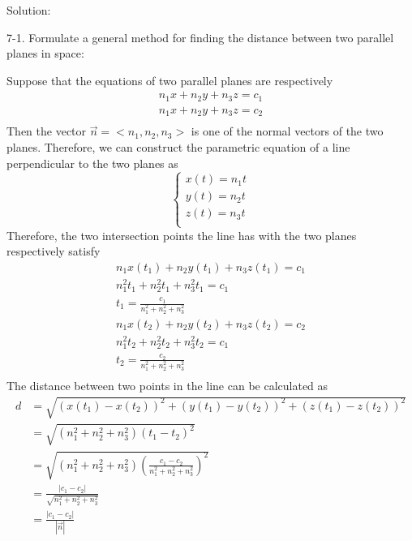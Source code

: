 \documentclass{article}
\begin{document}
Solution:

7-1. Formulate a general method for finding the distance between two parallel 
planes in space:

Suppose that the equations of two parallel planes are respectively
\begin{gather*}
  n_1x + n_2y + n_3z = c_1 \\
  n_1x + n_2y + n_3z = c_2 \\
\end{gather*}
Then the vector $\vec{n} = <n_1, n_2, n_3>$ is one of the normal vectors of the 
two planes. Therefore, we can construct the parametric equation of a line 
perpendicular to the two planes as
\begin{equation*}
  \begin{cases}
    x(t) = n_1t \\
    y(t) = n_2t \\
    z(t) = n_3t \\
  \end{cases}
\end{equation*}
Therefore, the two intersection points the line has with the two planes 
respectively satisfy
\begin{gather*}
  n_1x(t_1) + n_2y(t_1) + n_3z(t_1) = c_1 \\
  n_1^2t_1 + n_2^2t_1 + n_3^2t_1 = c_1 \\
  t_1 = \frac{c_1}{n_1^2 + n_2^2 + n_3^2} \\
  n_1x(t_2) + n_2y(t_2) + n_3z(t_2) = c_2 \\
  n_1^2t_2 + n_2^2t_2 + n_3^2t_2 = c_1 \\
  t_2 = \frac{c_2}{n_1^2 + n_2^2 + n_3^2} \\
\end{gather*}
The distance between two points in the line can be calculated as 
\begin{equation*}
  \begin{split}
    d &= \sqrt{(x(t_1) - x(t_2))^2 + (y(t_1) - y(t_2))^2 + (z(t_1) - z(t_2))^2} \\
      &= \sqrt{(n_1^2 + n_2^2 + n_3^2)(t_1 - t_2)^2} \\
      &= \sqrt{(n_1^2 + n_2^2 + n_3^2)(\frac{c_1 - c_2}{n_1^2 + n_2^2 + n_3^2})^2} \\
      &= \frac{|c_1 - c_2|}{\sqrt{n_1^2 + n_2^2 + n_3^2}} \\
      &= \frac{|c_1 - c_2|}{|\vec{n}|} \\
  \end{split}
\end{equation*}
\end{document}
